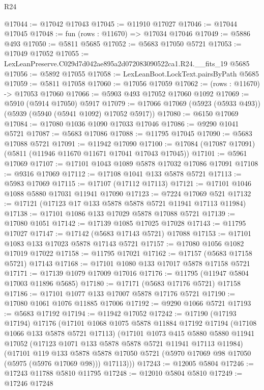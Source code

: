 \begin{lexlean}{R24}
\begin{coremodule}
@17044 := @17042 @17043
@17045 := @11910 @17027
@17046 := @17044 @17045
@17048 := fun (rows : @11670) => @17034 @17046
@17049 := @5886 @493
@17050 := @5811 @5685
@17052 := @5683 @17050 @5721
@17053 := @17049 @17052
@17055 := LexLeanPreserve.C029d7d042ae895a2d072083090522ca1.R24.__fits_19 @5685
@17056 := @5892 @17055
@17058 := LexLeanBoot.LockText.pairsByPath @5685
@17059 := @5811 @17058
@17060 := @17056 @17059
@17062 := (rows : @11670) -> @17053 @17060
@17066 := @5903 @493 @17052 @17060 @1092
@17069 := @5910 (@5914 @17050) @5917
@17079 := @17066 @17069 (@5923 (@5933 @493)) (@5939 (@5940 (@5941 @1092) @17052 @5917))
@17080 := @6150 @17069
@17084 := @17080 @1036 @1090 @17033 @17046
@17086 := @9290 @1041 @5721
@17087 := @5683 @17086
@17088 := @11795 @17045
@17090 := @5683 @17088 @5721
@17091 := @11942 @17090
@17100 := @17084 (@17087 @17091) (@5811 (@11946 @11670 @11671 @17041 @17043 @17045))
@17101 := @5961 @17069
@17107 := @17101 @1043 @1089 @5878 @17032 @17086 @17091
@17108 := @9316 @17069
@17112 := @17108 @1041 @133 @5878 @5721
@17113 := @5983 @17069
@17115 := @17107 (@17112 @17113)
@17121 := @17101 @1046 @1088 @5880 @17031 @11941 @17090
@17123 := @7224 @17069 @521
@17132 := @17121 (@17123 @17 @133 @5878 @5878 @5721 @11941 @17113 @11984)
@17138 := @17101 @1086 @133 @17029 @5878 @17088 @5721
@17139 := @17080 @1051
@17142 := @17139 @1085 @17025 @17028
@17143 := @11795 @17027
@17147 := @17142 (@5683 @17143 @5721) @17088
@17153 := @17101 @1083 @133 @17023 @5878 @17143 @5721
@17157 := @17080 @1056 @1082 @17019 @17022
@17158 := @11795 @17021
@17162 := @17157 (@5683 @17158 @5721) @17143
@17168 := @17101 @1080 @133 @17017 @5878 @17158 @5721
@17171 := @17139 @1079 @17009 @17016
@17176 := @11795 (@11947 @5804 @17003 @11896 @5685)
@17180 := @17171 (@5683 @17176 @5721) @17158
@17186 := @17101 @1077 @133 @17007 @5878 @17176 @5721
@17190 := @17080 @1061 @1076 @11885 @17006
@17192 := @9290 @1066 @5721
@17193 := @5683 @17192
@17194 := @11942 @17052
@17242 := @17190
    (@17193 @17194)
    @17176
    (@17101
      @1068
      @1075
      @5878
      @11884
      @17192
      @17194
      (@17108 @1066 @133 @5878 @5721 @17113)
      (@17101
        @1073
        @415
        @5880
        @5880
        @11941
        @17052
        (@17123 @1071 @133 @5878 @5878 @5721 @11941 @17113 @11984)
        (@17101
          @119
          @133
          @5878
          @5878
          @17050
          @5721
          (@5970 @17069 @98 @17050 (@5975 (@5976 @17069 @98)))
          @17113)))
@17243 := @12005 @5804
@17246 := @17243 @11788 @5810 @11795
@17248 := @12010 @5804 @5810
@17249 := @17246 @17248

\end{coremodule}
\end{lexlean}
